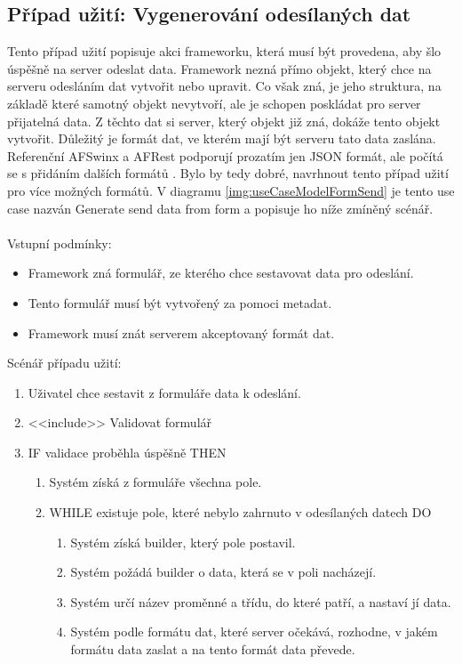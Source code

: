 \subsection{Případ užití: Vygenerování odesílaných dat}
Tento případ užití popisuje akci frameworku, která musí být provedena, aby šlo úspěšně na server odeslat data. Framework nezná přímo objekt, který chce na serveru odesláním dat vytvořit nebo upravit. Co však zná, je jeho struktura, na základě které samotný objekt nevytvoří, ale je schopen poskládat pro server přijatelná data. Z těchto dat si server, který objekt již zná, dokáže tento objekt vytvořit. Důležitý je formát dat, ve kterém mají být serveru tato data zaslána. Referenční AFSwinx a AFRest podporují prozatím jen JSON formát, ale počítá se s přidáním dalších formátů \cite{tomasek-thesis}. Bylo by tedy dobré, navrhnout tento případ užití pro více možných formátů. V diagramu \ref{img:useCaseModelFormSend} je tento use case nazván Generate send data from form a popisuje ho níže zmíněný scénář.\\\\
Vstupní podmínky:
\begin{itemize}
\item Framework zná formulář, ze kterého chce sestavovat data pro odeslání. 
\item Tento formulář musí být vytvořený za pomoci metadat. 
\item Framework musí znát serverem akceptovaný formát dat. 
\end{itemize}
Scénář případu užití:
\begin{enumerate}
\item Uživatel chce sestavit z formuláře data k odeslání.
\item <<include>> Validovat formulář
\item IF validace proběhla úspěšně THEN
\begin{enumerate}
\item Systém získá z formuláře všechna pole.
\item WHILE existuje pole, které nebylo zahrnuto v odesílaných datech DO
\begin{enumerate}
\item Systém získá builder, který pole postavil.
\item Systém požádá builder o data, která se v poli nacházejí.
\item  Systém určí název proměnné a třídu, do které patří, a nastaví jí data.
\item  Systém podle formátu dat, které server očekává, rozhodne, v jakém formátu data zaslat a na tento formát data převede. 
\end{enumerate}
\end{enumerate}
\end{enumerate}

